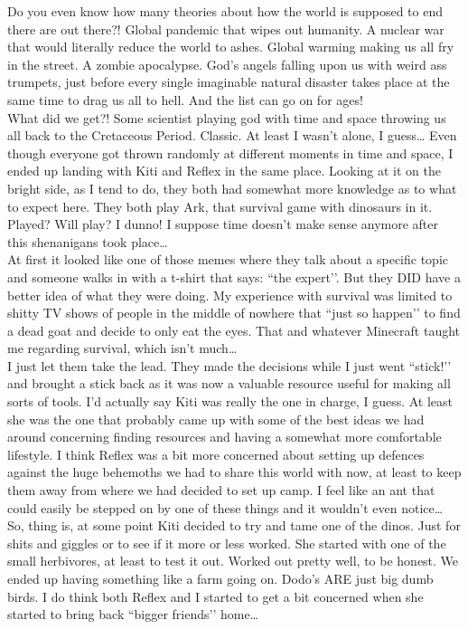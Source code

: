 \documentclass[a4paper,onecolumn,11pt]{article}
\begin{document}
Do you even know how many theories about how the world is supposed to end there are out there?! Global pandemic that wipes out humanity. A nuclear war that would literally reduce the world to ashes. Global warming making us all fry in the street. A zombie apocalypse. God’s angels falling upon us with weird ass trumpets, just before every single imaginable natural disaster takes place at the same time to drag us all to hell. And the list can go on for ages!\\
\newline
What did we get?! Some scientist playing god with time and space throwing us all back to the Cretaceous Period. Classic. At least I wasn’t alone, I guess… Even though everyone got thrown randomly at different moments in time and space, I ended up landing with Kiti and Reflex in the same place. Looking at it on the bright side, as I tend to do, they both had somewhat more knowledge as to what to expect here. They both play Ark, that survival game with dinosaurs in it. Played? Will play? I dunno! I suppose time doesn’t make sense anymore after this shenanigans took place\ldots \\
\newline
At first it looked like one of those memes where they talk about a specific topic and someone walks in with a t-shirt that says: ``the expert’’. But they DID have a better idea of what they were doing. My experience with survival was limited to shitty TV shows of people in the middle of nowhere that ``just so happen’’ to find a dead goat and decide to only eat the eyes. That and whatever Minecraft taught me regarding survival, which isn’t much\ldots \\
\newline
I just let them take the lead. They made the decisions while I just went ``stick!’’ and brought a stick back as it was now a valuable resource useful for making all sorts of tools. 
I’d actually say Kiti was really the one in charge, I guess. At least she was the one that probably came up with some of the best ideas we had around concerning finding resources and having a somewhat more comfortable lifestyle. I think Reflex was a bit more concerned about setting up defences against the huge behemoths we had to share this world with now, at least to keep them away from where we had decided to set up camp. I feel like an ant that could easily be stepped on by one of these things and it wouldn’t even notice\ldots \\
\newline
So, thing is, at some point Kiti decided to try and tame one of the dinos. Just for shits and giggles or to see if it more or less worked. She started with one of the small herbivores, at least to test it out. Worked out pretty well, to be honest. We ended up having something like a farm going on. Dodo’s ARE just big dumb birds. I do think both Reflex and I started to get a bit concerned when she started to bring back ``bigger friends’’ home\ldots \\
\end{document}
